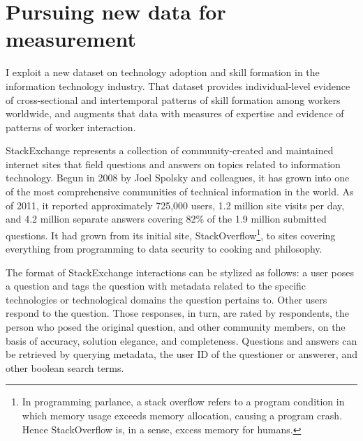 \documentclass[11pt]{article}
\begin{document}
\section{Pursuing new data for measurement}
\label{sec:data}

I exploit a new dataset on technology adoption and skill formation in
the information technology industry. That dataset provides
individual-level evidence of cross-sectional and intertemporal
patterns of skill formation among workers worldwide, and augments that
data with measures of expertise and evidence of patterns of worker
interaction. 

StackExchange represents a collection of community-created and
maintained internet sites that field questions and answers on topics related to information
technology. Begun in 2008 by Joel Spolsky and colleagues, it has grown
into one of the most comprehensive communities of technical
information in the world. As of 2011, it reported approximately
725,000 users, 1.2 million site visits per day, and 4.2 million separate
answers covering 82\%  of the 1.9 million submitted questions. It had grown from its initial site,
StackOverflow\footnote{In programming parlance, a stack overflow
  refers to a program condition in which memory usage exceeds
  memory allocation, causing a program crash. Hence StackOverflow is,
  in a sense, excess memory for humans.}, to sites covering everything
from programming to data security to cooking and philosophy. 

The format of StackExchange interactions can be stylized as follows: a
user poses a question and tags the question with metadata related to
the specific technologies or technological domains the question
pertains to. Other users respond to the question. Those responses, in
turn, are rated by respondents, the person who posed the original
question, and other community members, on the basis of accuracy,
solution elegance, and completeness. Questions and answers can be
retrieved by querying metadata, the user ID of the questioner or
answerer, and other boolean search terms. 
\end{document}
